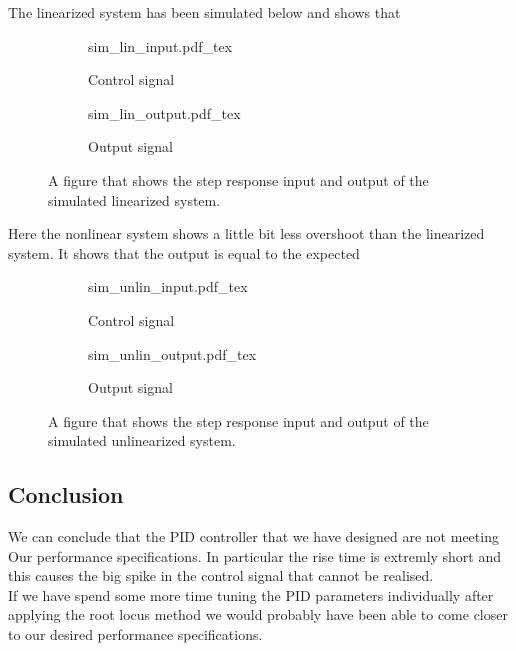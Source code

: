 \documentclass[12pt]{article}
\begin{document}
The linearized system has been simulated below and shows that

\begin{figure}[H]
\centering
\begin{subfigure}{0.5\textwidth}
  \def\svgwidth{\textwidth}
  {sim_lin_input.pdf_tex}
  \label{}
  \centering
  \caption{Control signal} \label{my_input_step_li}
\end{subfigure}%
\begin{subfigure}{0.5\textwidth}
  \centering
  \def\svgwidth{\textwidth}
  {sim_lin_output.pdf_tex}
  \caption{Output signal} \label{my_output_step_li}
\end{subfigure}
\caption{A figure that shows the step response input and output of the simulated linearized system.}
\label{fig:step_li}
\end{figure}

Here the nonlinear system shows a little bit less overshoot than the linearized system. It shows that the output is equal to the expected


\begin{figure}[H]
\centering
\begin{subfigure}{0.5\textwidth}
  \def\svgwidth{\textwidth}
  {sim_unlin_input.pdf_tex}
  \label{}
  \centering
  \caption{Control signal} \label{my_input_step_li}
\end{subfigure}%
\begin{subfigure}{0.5\textwidth}
  \centering
  \def\svgwidth{\textwidth}
  {sim_unlin_output.pdf_tex}
  \caption{Output signal} \label{my_output_step_li}
\end{subfigure}
\caption{A figure that shows the step response input and output of the simulated unlinearized system.}
\label{fig:step_li}
\end{figure}

\subsection*{Conclusion}
We can conclude that the PID controller that we have designed are not meeting Our performance specifications. In particular the rise time is extremly short and this causes the big spike in the control signal that cannot be realised.\\
If we have spend some more time tuning the PID parameters individually after applying the root locus method we would probably have been able to come closer to our desired performance specifications.
\end{document}
